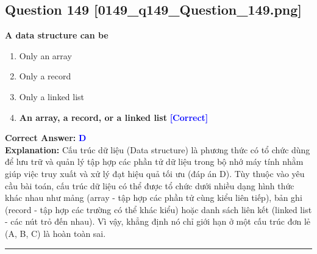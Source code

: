 \documentclass[11pt,a4paper]{article}
\begin{document}
\begin{minipage}{\textwidth}
\subsection*{Question 149 \quad \footnotesize{[0149\_q149\_Question\_149.png]}}
\noindent \textbf{A data structure can be}

\begin{enumerate}[label=\Alph*.]
    \item Only an array
    \item Only a record
    \item Only a linked list
    \item \textbf{An array, a record, or a linked list} \hfill \textcolor{blue}{\textbf{[Correct]}}
\end{enumerate}

\noindent \textbf{Correct Answer:} \textcolor{blue}{\textbf{D}} \\[2pt]
\noindent \textbf{Explanation:} Cấu trúc dữ liệu (Data structure) là phương thức có tổ chức dùng để lưu trữ và quản lý tập hợp các phần tử dữ liệu trong bộ nhớ máy tính nhằm giúp việc truy xuất và xử lý đạt hiệu quả tối ưu (đáp án D). Tùy thuộc vào yêu cầu bài toán, cấu trúc dữ liệu có thể được tổ chức dưới nhiều dạng hình thức khác nhau như mảng (array - tập hợp các phần tử cùng kiểu liên tiếp), bản ghi (record - tập hợp các trường có thể khác kiểu) hoặc danh sách liên kết (linked list - các nút trỏ đến nhau). Vì vậy, khẳng định nó chỉ giới hạn ở một cấu trúc đơn lẻ (A, B, C) là hoàn toàn sai.

\par\vspace{0.3cm}
\hrule
\vspace{0.3cm}
\end{minipage}
\end{document}
